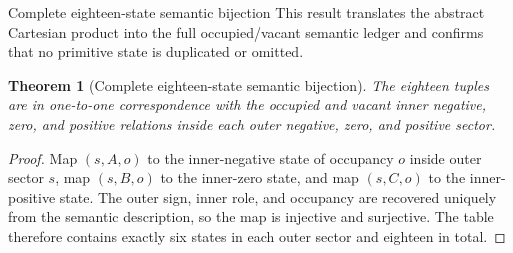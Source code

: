 \documentclass[11pt]{article}
\numberwithin{equation}{section}
\newtheorem{theorem}[definition]{Theorem}
\theoremstyle{remark}
\begin{document}
\begin{proofguide}{Complete eighteen-state semantic bijection}
This result translates the abstract Cartesian product into the full occupied/vacant semantic ledger and confirms that no primitive state is duplicated or omitted.
\end{proofguide}
\begin{theorem}[Complete eighteen-state semantic bijection]
The eighteen tuples are in one-to-one correspondence with the occupied and vacant inner negative, zero, and positive relations inside each outer negative, zero, and positive sector.
\end{theorem}
\begin{proof}
Map $(s,A,o)$ to the inner-negative state of occupancy $o$ inside outer sector $s$, map $(s,B,o)$ to the inner-zero state, and map $(s,C,o)$ to the inner-positive state. The outer sign, inner role, and occupancy are recovered uniquely from the semantic description, so the map is injective and surjective. The table therefore contains exactly six states in each outer sector and eighteen in total.
\end{proof}
\end{document}
